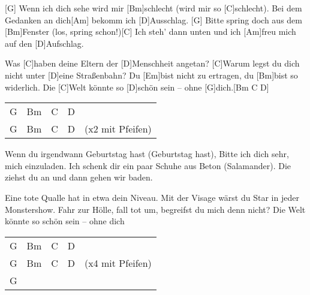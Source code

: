 

\begin{guitar}
	[G] Wenn ich dich sehe wird mir [Bm]schlecht (wird mir so [C]schlecht).
	Bei dem Gedanken an dich[Am] bekomm ich [D]Ausschlag.
	[G] Bitte spring doch aus dem [Bm]Fenster (los, spring schon!)[C]{}
	Ich steh' dann unten und ich [Am]freu mich auf den [D]Aufschlag.
	
	Was [C]haben deine Eltern der [D]Menschheit angetan?
	[C]Warum legst du dich nicht unter [D]eine Straßenbahn?
	Du [Em]bist nicht zu ertragen, du [Bm]bist so widerlich.
	Die [C]Welt könnte so [D]schön sein – ohne [G]dich.[Bm C D]{}
	
	{\footnotesize\begin{tabular}{l|l|l|l l}
			G & Bm & C & D & \\
			G & Bm & C & D & (x2 mit Pfeifen)
	\end{tabular}}

	Wenn du irgendwann Geburtstag hast (Geburtstag hast),
	Bitte ich dich sehr, mich einzuladen.
	Ich schenk dir ein paar Schuhe aus Beton (Salamander).
	Die ziehst du an und dann gehen wir baden.
	
	Eine tote Qualle hat in etwa dein Niveau.
	Mit der Visage wärst du Star in jeder Monstershow.
	Fahr zur Hölle, fall tot um, begreifst du mich denn nicht?
	Die Welt könnte so schön sein – ohne dich
	
	{\footnotesize\begin{tabular}{l|l|l|l l}
		G & Bm & C & D &  \\
		G & Bm & C & D & (x4 mit Pfeifen) \\
		G & & & &
	\end{tabular}}
\end{guitar}